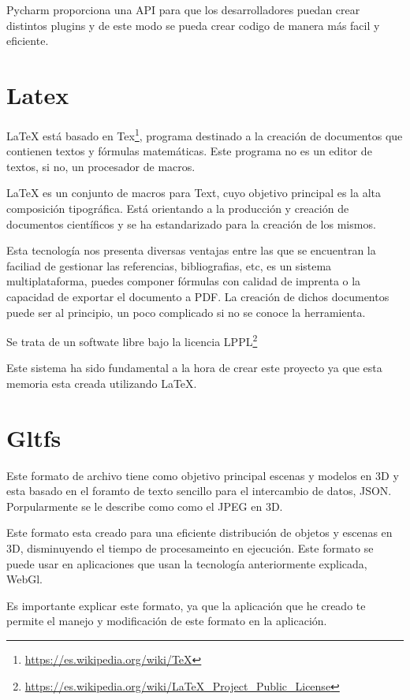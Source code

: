 \documentclass[a4paper, 12pt]{book}
\begin{document}
Pycharm proporciona una API para que los desarrolladores puedan crear distintos plugins y de este modo se pueda crear codigo de manera más facil y eficiente.

\section{Latex} %
\label{sec:Latex}
LaTeX está basado en Tex\footnote{\url{https://es.wikipedia.org/wiki/TeX}}, programa destinado a la creación de documentos que contienen textos y fórmulas matemáticas. Este programa no es un editor de textos, si no, un procesador de macros.

LaTeX es un conjunto de macros para Text, cuyo objetivo principal es la alta composición tipográfica. Está orientando a la producción y creación de documentos científicos y se ha estandarizado para la creación de los mismos.

Esta tecnología nos presenta diversas ventajas entre las que se encuentran la faciliad de gestionar las referencias, bibliografias, etc, es un sistema multiplataforma, puedes componer fórmulas con calidad de imprenta o la capacidad de exportar el documento a PDF. La creación de dichos documentos puede ser al principio, un poco complicado si no se conoce la herramienta.

Se trata de un softwate libre bajo la licencia LPPL\footnote{\url{https://es.wikipedia.org/wiki/LaTeX_Project_Public_License}} 

Este sistema ha sido fundamental a la hora de crear este proyecto ya que esta memoria esta creada utilizando LaTeX.

\section{Gltfs} %
\label{sec:Gltfs}
Este formato de archivo tiene como objetivo principal escenas y modelos en 3D y esta basado en el foramto de texto sencillo para el intercambio de datos, JSON. Porpularmente se le describe como como el JPEG en 3D.

Este formato esta creado para una eficiente distribución de objetos y escenas en 3D, disminuyendo el tiempo de procesameinto en ejecución. Este formato se puede usar en aplicaciones que usan la tecnología anteriormente explicada, WebGl.

Es importante explicar este formato, ya que la aplicación que he creado te permite el manejo y  modificación de este formato en la aplicación.
\end{document}
